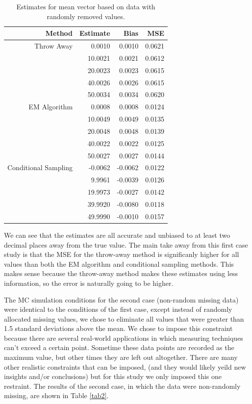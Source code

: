 \documentclass{svproc}
\begin{document}
\begin{table}[!ht]

\centering
\begin{tabular}{rrrr}
  \hline
Method & Estimate & Bias & MSE \\ 
  \hline
  Throw Away & 0.0010 & 0.0010 & 0.0621 \\ 
   & 10.0021 & 0.0021 & 0.0612 \\ 
   & 20.0023 & 0.0023 & 0.0615 \\ 
   & 40.0026 & 0.0026 & 0.0615 \\ 
   & 50.0034 & 0.0034 & 0.0620 \\   \hline
  EM Algorithm & 0.0008 & 0.0008 & 0.0124 \\ 
   & 10.0049 & 0.0049 & 0.0135 \\ 
   & 20.0048 & 0.0048 & 0.0139 \\ 
   & 40.0022 & 0.0022 & 0.0125 \\ 
   & 50.0027 & 0.0027 & 0.0144 \\   \hline
  Conditional Sampling & -0.0062 & -0.0062 & 0.0122 \\ 
   & 9.9961 & -0.0039 & 0.0126 \\ 
   & 19.9973 & -0.0027 & 0.0142 \\ 
   & 39.9920 & -0.0080 & 0.0118 \\ 
   & 49.9990 & -0.0010 & 0.0157 \\ 
   \hline
\end{tabular}

\caption{Estimates for mean vector based on data with randomly removed values.}
\label{tab1}
\end{table}

We can see that the estimates are all accurate and unbiased to at least two decimal places away from the true value. The main take away from this first case study is that the MSE for the throw-away method is significanly higher for all values than both the EM algorithm and conditional sampling methods. This makes sense because the throw-away method makes these estimates using less information, so the error is naturally going to be higher. 


The MC simulation conditions for the second case (non-random missing data) were identical to the conditions of the first case, except instead of randomly allocated missing values, we chose to eliminate all values that were greater than 1.5 standard deviations above the mean. We chose to impose this constraint because there are several real-world applications in which measuring techniques can't exceed a certain point. Sometime these data points are recorded as the maximum value, but other times they are left out altogether. There are many other realistic constraints that can be imposed, (and they would likely yeild new insights and/or conclusions) but for this study we only imposed this one restraint. The results of the second case, in which the data were non-randomly missing, are shown in Table \ref{tab2}.
\end{document}
